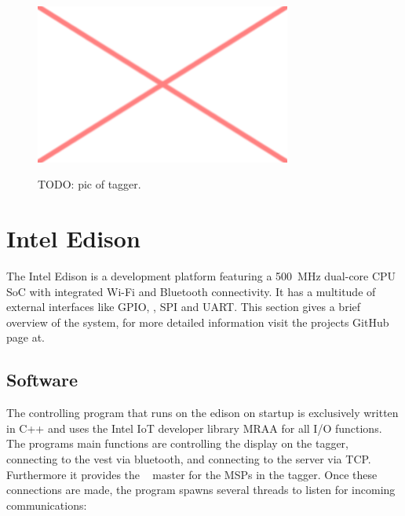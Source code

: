 \begin{figure}[h!]
\centering
\includegraphics[width=0.75\textwidth]{images/placeholder.png}\\
\caption[Edison Tagger]{TODO: pic of tagger.}
\label{fig:tag_ed_pic}
\end{figure}

\section{Intel Edison}
The Intel Edison is a development platform featuring a \SI{500}{\mega\hertz} dual-core CPU SoC with integrated Wi-Fi 
and Bluetooth connectivity. It has a multitude of external interfaces like GPIO, \isqc, SPI and UART. This section 
gives a brief overview of the system, for more detailed information visit the projects GitHub page at.

\subsection{Software}
The controlling program that runs on the edison on startup is exclusively written in C++ and uses the Intel IoT 
developer library MRAA for all I/O functions. The programs main functions are controlling the display on the 
tagger, connecting to the vest via bluetooth, and connecting to the server via TCP. Furthermore it provides the \isqc~
master for the MSPs in the tagger. Once these connections are made, the program spawns several threads to listen for 
incoming communications:

